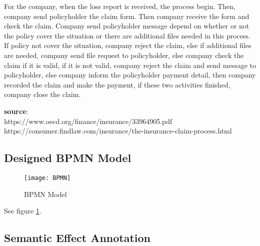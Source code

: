 \documentclass[runningheads]{llncs}
\begin{document}
\noindent
For the company, when the loss report is received, the process begin. Then, company send policyholder the claim form. Then company receive the form and check the claim. Company send policyholder message depend on whether or not the policy cover the situation or there are additional files needed in this process. If policy not cover the situation, company reject the claim, else if additional files are needed, company send file request to policyholder, else company check the claim if it is valid, if it is not valid, company reject the claim and send message to policyholder, else company inform the policyholder payment detail, then company recorded the claim and make the payment, if these two activities finished, company close the claim.

\noindent
\textbf{source}: \\
https://www.oecd.org/finance/insurance/33964905.pdf \\
https://consumer.findlaw.com/insurance/the-insurance-claim-process.html\\






\subsection{Designed BPMN Model}
\begin{figure}
\centering 
\texttt{[image: BPMN]} 
\caption{BPMN Model} 
\label{BPMN} 
\end{figure}

See figure \ref{BPMN}.



\subsection{Semantic Effect Annotation}
\end{document}
